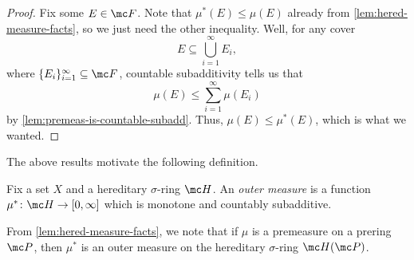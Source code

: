 \documentclass[../notes.tex]{subfiles}
\begin{document}
\begin{proof}
	Fix some $E\in\mc F$. Note that $\mu^*(E)\le\mu(E)$ already from \autoref{lem:hered-measure-facts}, so we just need the other inequality. Well, for any cover
	\[E\subseteq\bigcup_{i=1}^\infty E_i,\]
	where $\{E_i\}_{i=1}^\infty\subseteq\mc F$, countable subadditivity tells us that
	\[\mu(E)\le\sum_{i=1}^\infty\mu(E_i)\]
	by \autoref{lem:premeas-is-countable-subadd}. Thus, $\mu(E)\le\mu^*(E)$, which is what we wanted.
\end{proof}
The above results motivate the following definition.
\begin{definition}
	Fix a set $X$ and a hereditary $\sigma$-ring $\mc H$. An \textit{outer measure} is a function $\mu^*\colon\mc H\to[0,\infty]$ which is monotone and countably subadditive.
\end{definition}
\begin{example} \label{ex:hered-measure-is-outer}
	From \autoref{lem:hered-measure-facts}, we note that if $\mu$ is a premeasure on a prering $\mc P$, then $\mu^*$ is an outer measure on the hereditary $\sigma$-ring $\mc H(\mc P)$.
\end{example}
\end{document}
